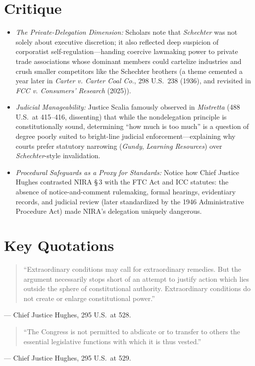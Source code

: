 \documentclass[12pt]{article}
\begin{document}
\section{Critique}
\begin{itemize}
  \item \textit{The Private-Delegation Dimension:} Scholars note that \textit{Schechter} was not solely about executive discretion; it also reflected deep suspicion of corporatist self-regulation---handing coercive lawmaking power to private trade associations whose dominant members could cartelize industries and crush smaller competitors like the Schechter brothers (a theme cemented a year later in \textit{Carter v. Carter Coal Co.}, 298 U.S.\ 238 (1936), and revisited in \textit{FCC v. Consumers' Research} (2025)).
  \item \textit{Judicial Manageability:} Justice Scalia famously observed in \textit{Mistretta} (488 U.S.\ at 415--416, dissenting) that while the nondelegation principle is constitutionally sound, determining ``how much is too much'' is a question of degree poorly suited to bright-line judicial enforcement---explaining why courts prefer statutory narrowing (\textit{Gundy}, \textit{Learning Resources}) over \textit{Schechter}-style invalidation.
  \item \textit{Procedural Safeguards as a Proxy for Standards:} Notice how Chief Justice Hughes contrasted NIRA \S\,3 with the FTC Act and ICC statutes: the absence of notice-and-comment rulemaking, formal hearings, evidentiary records, and judicial review (later standardized by the 1946 Administrative Procedure Act) made NIRA's delegation uniquely dangerous.
\end{itemize}

\section{Key Quotations}
\begin{quote}
``Extraordinary conditions may call for extraordinary remedies. But the argument necessarily stops short of an attempt to justify action which lies outside the sphere of constitutional authority. Extraordinary conditions do not create or enlarge constitutional power.''
\end{quote}
\noindent --- Chief Justice Hughes, 295 U.S.\ at 528.

\begin{quote}
``The Congress is not permitted to abdicate or to transfer to others the essential legislative functions with which it is thus vested.''
\end{quote}
\noindent --- Chief Justice Hughes, 295 U.S.\ at 529.
\end{document}
